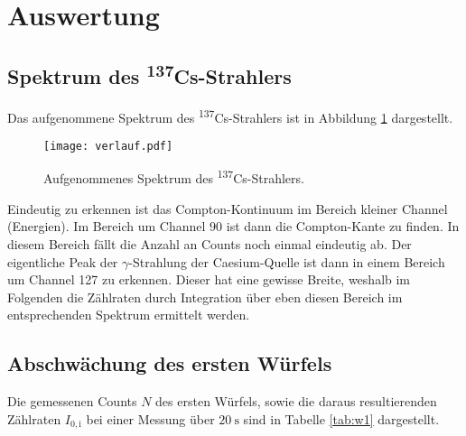 \section{Auswertung}
\label{sec:Auswertung}

\subsection{Spektrum des \textsuperscript{137}Cs-Strahlers}

Das aufgenommene Spektrum des \textsuperscript{137}Cs-Strahlers ist in Abbildung
\ref{fig:verlauf} dargestellt.

\begin{figure}[H]
  \centering
  \texttt{[image: verlauf.pdf]}
  \caption{Aufgenommenes Spektrum des \textsuperscript{137}Cs-Strahlers.}
  \label{fig:verlauf}
\end{figure}

Eindeutig zu erkennen ist das Compton-Kontinuum im Bereich kleiner Channel (Energien).
Im Bereich um Channel $90$ ist dann die Compton-Kante zu finden. In diesem Bereich
fällt die Anzahl an Counts noch einmal eindeutig ab. Der eigentliche Peak der $\gamma$-Strahlung der Caesium-Quelle
ist dann in einem Bereich um Channel 127 zu erkennen. Dieser hat eine gewisse Breite,
weshalb im Folgenden die Zählraten durch Integration über eben diesen Bereich im
entsprechenden Spektrum ermittelt werden.

\subsection{Abschwächung des ersten Würfels}
Die gemessenen Counts $N$ des ersten Würfels, sowie die daraus resultierenden Zählraten  $I_{0,\mathrm{i}}$ bei einer Messung
über $\SI{20}{\second}$ sind in Tabelle \ref{tab:w1} dargestellt.

